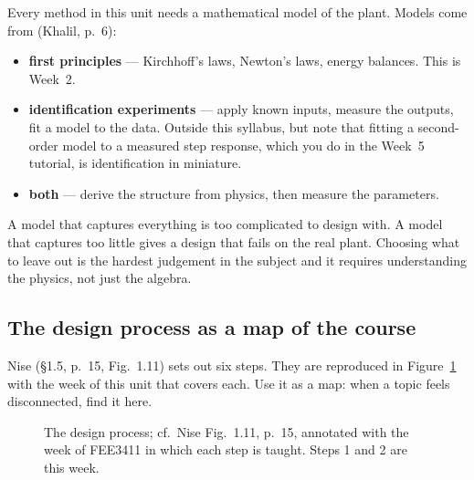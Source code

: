 \documentclass[11pt,a4paper]{article}
\begin{document}
Every method in this unit needs a mathematical model of the plant. Models come
from (Khalil, p.~6):

\begin{itemize}[leftmargin=*]
\item \textbf{first principles} --- Kirchhoff's laws, Newton's laws, energy
      balances. This is Week~2.
\item \textbf{identification experiments} --- apply known inputs, measure the
      outputs, fit a model to the data. Outside this syllabus, but note that
      fitting a second-order model to a measured step response, which you do in
      the Week~5 tutorial, is identification in miniature.
\item \textbf{both} --- derive the structure from physics, then measure the
      parameters.
\end{itemize}

A model that captures everything is too complicated to design with. A model
that captures too little gives a design that fails on the real plant. Choosing
what to leave out is the hardest judgement in the subject and it requires
understanding the physics, not just the algebra.

\subsection{The design process as a map of the course}

Nise (\S1.5, p.~15, Fig.~1.11) sets out six steps. They are reproduced in
Figure~\ref{fig:design} with the week of this unit that covers each. Use it as
a map: when a topic feels disconnected, find it here.

\begin{figure}[htbp]
\centering
{}
\caption{The design process; cf.\ Nise Fig.~1.11, p.~15, annotated with the
week of FEE3411 in which each step is taught. Steps 1 and 2 are this week.}
\label{fig:design}
\end{figure}
\end{document}
